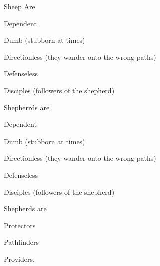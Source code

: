 Sheep Are\\
\begin{compactenum}[I.]
    \item Dependent 
    \item Dumb (stubborn at times)
    \item Directionless (they wander onto the wrong paths)
    \item Defenseless 
    \item Disciples (followers of the shepherd)\\
\end{compactenum}
Shepherrds are\\
\begin{compactenum}[I.]
    \item Dependent 
    \item Dumb (stubborn at times)
    \item Directionless (they wander onto the wrong paths)
    \item Defenseless 
    \item Disciples (followers of the shepherd)\\
\end{compactenum}
Shepherds are\\
\begin{compactenum}[I.]
    \item Protectors
    \item Pathfinders
    \item Providers.
\end{compactenum}

